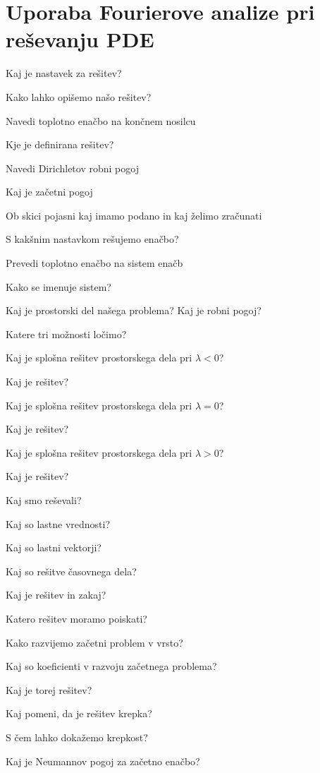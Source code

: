 \documentclass{article}
\begin{document}
    \section{Uporaba Fourierove analize pri reševanju PDE}
    \begin{enumerate}
        {\color{red}\item Kaj je nastavek za rešitev?}
        {\color{red}\item Kako lahko opišemo našo rešitev?}
        \item Navedi toplotno enačbo na končnem nosilcu
        {\color{red}\item Kje je definirana rešitev?}
        {\color{red}\item Navedi Dirichletov robni pogoj}
        \item Kaj je začetni pogoj
        \item Ob skici pojasni kaj imamo podano in kaj želimo zračunati
        \item S kakšnim nastavkom rešujemo enačbo?
        \item Prevedi toplotno enačbo na sistem enačb
        {\color{red}\item Kako se imenuje sistem?}
        \item Kaj je prostorski del našega problema? Kaj je robni pogoj?
        \item Katere tri možnosti ločimo?
        \item Kaj je splošna rešitev prostorskega dela pri $\lambda < 0$?
        \item Kaj je rešitev?
        \item Kaj je splošna rešitev prostorskega dela pri $\lambda = 0$?
        \item Kaj je rešitev?
        \item Kaj je splošna rešitev prostorskega dela pri $\lambda > 0$?
        \item Kaj je rešitev?
        \item Kaj smo reševali?
        \item Kaj so lastne vrednosti?
        \item Kaj so lastni vektorji?
        {\color{red}\item Kaj so rešitve časovnega dela?}
        {\color{red}\item Kaj je rešitev in zakaj?}
        \item Katero rešitev moramo poiskati?
        \item Kako razvijemo začetni problem v vrsto?
        {\color{red}\item Kaj so koeficienti v razvoju začetnega problema?}
        \item Kaj je torej rešitev?
        {\color{red}\item Kaj pomeni, da je rešitev krepka?}
        \item S čem lahko dokažemo krepkost?
        \item Kaj je Neumannov pogoj za začetno enačbo?
    \end{enumerate}
\end{document}
